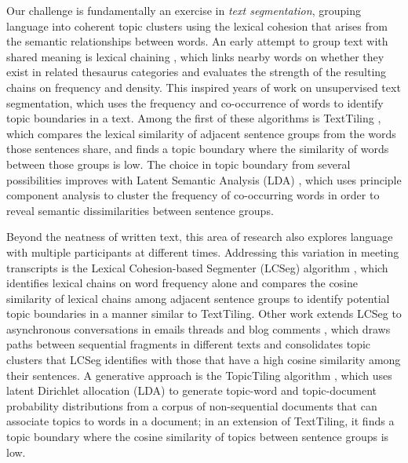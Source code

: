 \documentclass[letterpaper, 12pt]{article}
\begin{document}
Our challenge is fundamentally an exercise in \textit{text segmentation}, grouping language into coherent topic clusters using the lexical cohesion that arises from the semantic relationships between words. An early attempt to group text with shared meaning is lexical chaining \cite{morris-hirst-1991-lexical}, which links nearby words on whether they exist in related thesaurus categories and evaluates the strength of the resulting chains on frequency and density. This inspired years of work on unsupervised text segmentation, which uses the frequency and co-occurrence of words to identify topic boundaries in a text. Among the first of these algorithms is TextTiling \cite{hearst-1997-texttiling}, which compares the lexical similarity of adjacent sentence groups from the words those sentences share, and finds a topic boundary where the similarity of words between those groups is low. The choice in topic boundary from several possibilities improves with Latent Semantic Analysis (LDA) \cite{choi-etal-2001-latent}, which uses principle component analysis to cluster the frequency of co-occurring words in order to reveal semantic dissimilarities between sentence groups.

Beyond the neatness of written text, this area of research also explores language with multiple participants at different times. Addressing this variation in meeting transcripts is the Lexical Cohesion-based Segmenter (LCSeg) algorithm \cite{galley-etal-2003-discourse}, which identifies lexical chains on word frequency alone and compares the cosine similarity of lexical chains among adjacent sentence groups to identify potential topic boundaries in a manner similar to TextTiling. Other work extends LCSeg to asynchronous conversations in emails threads and blog comments \cite{joty-etal-2013-topic}, which draws paths between sequential fragments in different texts and consolidates topic clusters that LCSeg identifies with those that have a high cosine similarity among their sentences. A generative approach is the TopicTiling algorithm \cite{riedl-biemann-2012-topictiling}, which uses latent Dirichlet allocation (LDA) \cite{blei-etal-2003-latent} to generate topic-word and topic-document probability distributions from a corpus of non-sequential documents that can associate topics to words in a document; in an extension of TextTiling, it finds a topic boundary where the cosine similarity of topics between sentence groups is low.



\end{document}
